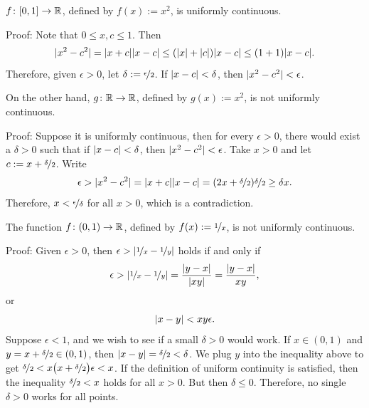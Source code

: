 \begin{example}
$f \colon [0,1] \to {\mathbb{R}}$, defined by $f(x) := x^2$, is uniformly continuous.

Proof: Note that $0 \leq x,c \leq 1$.  Then
\begin{equation*}
\lvert {x^2-c^2} \rvert = \lvert {x+c} \rvert\lvert {x-c} \rvert
\leq (\lvert {x} \rvert+\lvert {c} \rvert) \lvert {x-c} \rvert
\leq (1+1)\lvert {x-c} \rvert .
\end{equation*}
Therefore, given $\epsilon > 0$, let $\delta := \nicefrac{\epsilon}{2}$.
If $\lvert {x-c} \rvert < \delta$, then $\lvert {x^2-c^2} \rvert < \epsilon$.

\medskip

On the other hand, $g \colon {\mathbb{R}} \to {\mathbb{R}}$, defined by $g(x) := x^2$, is not uniformly
continuous.

Proof: Suppose it is uniformly continuous, then for every $\epsilon > 0$,
there would exist a $\delta > 0$ such that
if $\lvert {x-c} \rvert < \delta$, then $\lvert {x^2 -c^2} \rvert < \epsilon$.
Take $x > 0$ and let
$c := x+\nicefrac{\delta}{2}$.  Write
\begin{equation*}
\epsilon >
\lvert {x^2-c^2} \rvert = \lvert {x+c} \rvert\lvert {x-c} \rvert
=
(2x+\nicefrac{\delta}{2})\nicefrac{\delta}{2} 
\geq 
\delta x .
\end{equation*}
Therefore, $x < \nicefrac{\epsilon}{\delta}$ for all $x > 0$, which is a
contradiction.
\end{example}


\begin{example}
The function $f \colon (0,1) \to {\mathbb{R}}$, defined by $f(x) := \nicefrac{1}{x}$, is not
uniformly continuous.

Proof: Given $\epsilon > 0$, then $\epsilon >
\left\lvert {\nicefrac{1}{x}-\nicefrac{1}{y}} \right\rvert$ holds if and only if
\begin{equation*}
\epsilon >
\left\lvert {\nicefrac{1}{x}-\nicefrac{1}{y}} \right\rvert
=
\frac{\left\lvert {y-x} \right\rvert}{\left\lvert {xy} \right\rvert} 
=
\frac{\left\lvert {y-x} \right\rvert}{xy} ,
\end{equation*}
or
\begin{equation*}
\left\lvert {x-y} \right\rvert < xy \epsilon .
\end{equation*}
Suppose $\epsilon < 1$, and we wish to see if a 
small $\delta > 0$ would work.
If $x \in (0,1)$ and 
$y = x+\nicefrac{\delta}{2} \in (0,1)$,
then $\left\lvert {x-y} \right\rvert = \nicefrac{\delta}{2} < \delta$.
We plug $y$ into the inequality above to get $\nicefrac{\delta}{2} <
x \bigl( x+\nicefrac{\delta}{2} \bigr) \epsilon < x$.
If the definition of uniform continuity is satisfied, then
the inequality $\nicefrac{\delta}{2} < x$ holds for all $x > 0$.   But then $\delta \leq 0$.
Therefore, no single $\delta > 0$ works for all points.
\end{example}

